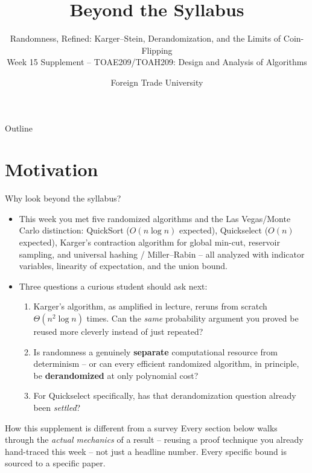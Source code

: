 \documentclass[11pt,aspectratio=169]{beamer}
\title{Beyond the Syllabus}
\subtitle{Randomness, Refined: Karger--Stein, Derandomization, and the Limits of
Coin-Flipping\\
\small Week 15 Supplement -- TOAE209/TOAH209: Design and Analysis of Algorithms}
\author{Foreign Trade University}
\date{}
\begin{document}
\begin{frame}
  \titlepage
\end{frame}

\begin{frame}{Outline}
  \tableofcontents
\end{frame}

\section{Motivation}

\begin{frame}{Why look beyond the syllabus?}
  \small
  \begin{itemize}
    \item This week you met five randomized algorithms and the Las Vegas/Monte Carlo
    distinction: QuickSort ($O(n\log n)$ expected), Quickselect ($O(n)$ expected),
    Karger's contraction algorithm for global min-cut, reservoir sampling, and
    universal hashing / Miller--Rabin -- all analyzed with indicator variables,
    linearity of expectation, and the union bound.
    \item Three questions a curious student should ask next:
    \begin{enumerate}
      \item Karger's algorithm, as amplified in lecture, reruns from scratch
      $\Theta(n^2\log n)$ times. Can the \emph{same} probability argument you proved be
      reused more cleverly instead of just repeated?
      \item Is randomness a genuinely \textbf{separate} computational resource from
      determinism -- or can every efficient randomized algorithm, in principle, be
      \textbf{derandomized} at only polynomial cost?
      \item For Quickselect specifically, has that derandomization question already
      been \emph{settled}?
    \end{enumerate}
  \end{itemize}
  \begin{alertblock}{How this supplement is different from a survey}
    Every section below walks through the \emph{actual mechanics} of a result --
    reusing a proof technique you already hand-traced this week -- not just a headline
    number. Every specific bound is sourced to a specific paper.
  \end{alertblock}
\end{frame}
\end{document}
